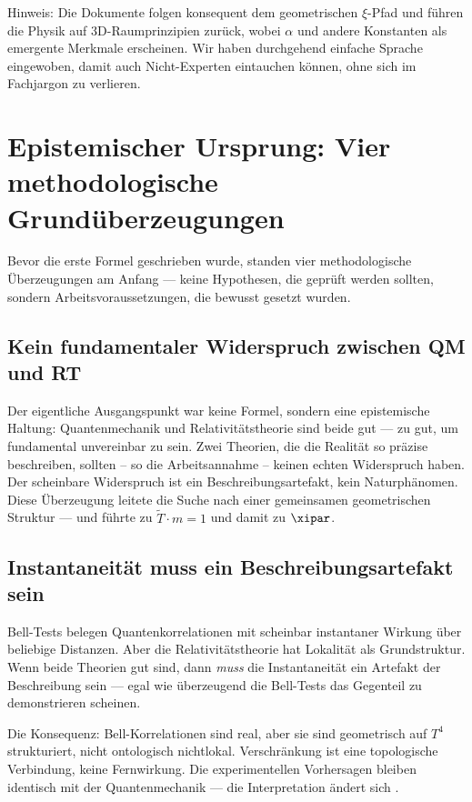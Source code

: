 	Hinweis: Die Dokumente folgen konsequent dem geometrischen $\xi$-Pfad und führen die Physik auf 3D-Raumprinzipien zurück, wobei $\alpha$ und andere Konstanten als emergente Merkmale erscheinen. Wir haben durchgehend einfache Sprache eingewoben, damit auch Nicht-Experten eintauchen können, ohne sich im Fachjargon zu verlieren.
	
	\section{Epistemischer Ursprung: Vier methodologische Grundüberzeugungen}

Bevor die erste Formel geschrieben wurde, standen vier methodologische Überzeugungen am Anfang --- keine Hypothesen, die geprüft werden sollten, sondern Arbeitsvoraussetzungen, die bewusst gesetzt wurden.

\subsection{Kein fundamentaler Widerspruch zwischen QM und RT}

Der eigentliche Ausgangspunkt war keine Formel, sondern eine epistemische Haltung: Quantenmechanik und Relativitätstheorie sind beide gut --- zu gut, um fundamental unvereinbar zu sein. Zwei Theorien, die die Realität so präzise beschreiben, sollten – so die Arbeitsannahme – keinen echten Widerspruch haben. Der scheinbare Widerspruch ist ein Beschreibungsartefakt, kein Naturphänomen. Diese Überzeugung leitete die Suche nach einer gemeinsamen geometrischen Struktur --- und führte zu $\tilde{T} \cdot m = 1$ und damit zu $\xipar$.

\subsection{Instantaneität muss ein Beschreibungsartefakt sein}

Bell-Tests belegen Quantenkorrelationen mit scheinbar instantaner Wirkung über beliebige Distanzen. Aber die Relativitätstheorie hat Lokalität als Grundstruktur. Wenn beide Theorien gut sind, dann \emph{muss} die Instantaneität ein Artefakt der Beschreibung sein --- egal wie überzeugend die Bell-Tests das Gegenteil zu demonstrieren scheinen.

Die Konsequenz: Bell-Korrelationen sind real, aber sie sind geometrisch auf $T^4$ strukturiert, nicht ontologisch nichtlokal. Verschränkung ist eine topologische Verbindung, keine Fernwirkung. Die experimentellen Vorhersagen bleiben identisch mit der Quantenmechanik --- die Interpretation ändert sich \cite{Hilbertraum2026}.


